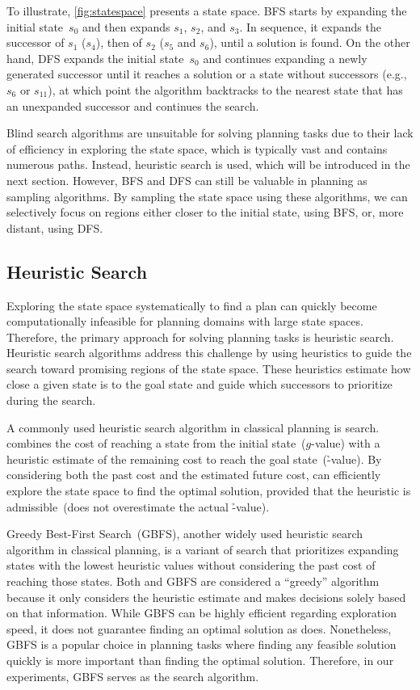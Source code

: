To illustrate, \cref{fig:statespace} presents a state space. BFS starts by expanding the initial state~$s_0$ and then expands $s_1$, $s_2$, and $s_3$. In sequence, it expands the successor of $s_1$ ($s_4$), then of $s_2$ ($s_5$ and $s_6$), until a solution is found. On the other hand, DFS expands the initial state~$s_0$ and continues expanding a newly generated successor until it reaches a solution or a state without successors (e.g.,~$s_6$ or $s_{11}$), at which point the algorithm backtracks to the nearest state that has an unexpanded successor and continues the search.

Blind search algorithms are unsuitable for solving planning tasks due to their lack of efficiency in exploring the state space, which is typically vast and contains numerous paths. Instead, heuristic search is used, which will be introduced in the next section. However, BFS and DFS can still be valuable in planning as sampling algorithms. By sampling the state space using these algorithms, we can selectively focus on regions either closer to the initial state, using BFS, or, more distant, using DFS.

\subsection{Heuristic Search}
\label{sec:heuristic-search}

Exploring the state space systematically to find a plan can quickly become computationally infeasible for planning domains with large state spaces. Therefore, the primary approach for solving planning tasks is heuristic search. Heuristic search algorithms address this challenge by using heuristics to guide the search toward promising regions of the state space. These heuristics estimate how close a given state is to the goal state and guide which successors to prioritize during the search.

A commonly used heuristic search algorithm in classical planning is \astar search. \astar combines the cost of reaching a state from the initial state~($g$-value) with a heuristic estimate of the remaining cost to reach the goal state~(\h-value). By considering both the past cost and the estimated future cost, \astar can efficiently explore the state space to find the optimal solution, provided that the heuristic is admissible~(does not overestimate the actual \h-value).

Greedy Best-First Search~(GBFS), another widely used heuristic search algorithm in classical planning, is a variant of \astar search that prioritizes expanding states with the lowest heuristic values without considering the past cost of reaching those states. Both \astar and GBFS are considered a ``greedy'' algorithm because it only considers the heuristic estimate and makes decisions solely based on that information. While GBFS can be highly efficient regarding exploration speed, it does not guarantee finding an optimal solution as \astar does. Nonetheless, GBFS is a popular choice in planning tasks where finding any feasible solution quickly is more important than finding the optimal solution. Therefore, in our experiments, GBFS serves as the search algorithm.

